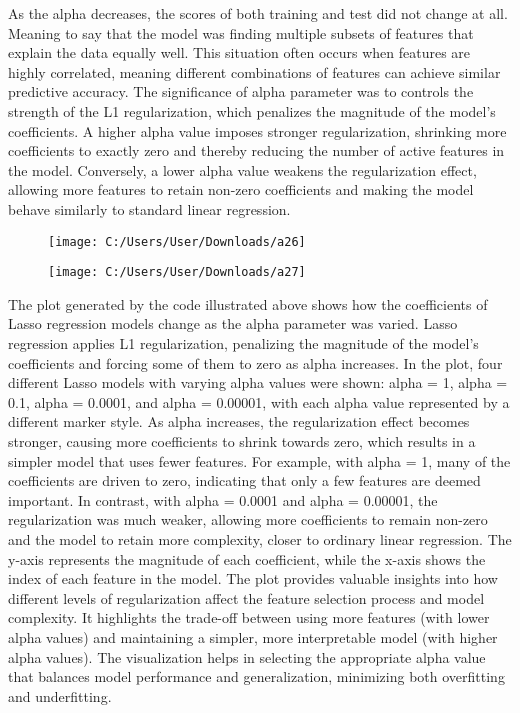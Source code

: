 \documentclass[12pt]{article}
\begin{document}
\indent As the alpha decreases, the scores of both training and test did not change at all. Meaning to say that the model was finding multiple subsets of features that explain the data equally well. This situation often occurs when features are highly correlated, meaning different combinations of features can achieve similar predictive accuracy. The significance of alpha parameter was to controls the strength of the L1 regularization, which penalizes the magnitude of the model's coefficients. A higher alpha value imposes stronger regularization, shrinking more coefficients to exactly zero and thereby reducing the number of active features in the model. Conversely, a lower alpha value weakens the regularization effect, allowing more features to retain non-zero coefficients and making the model behave similarly to standard linear regression.\\
\vspace{-10mm}
\begin{figure}[h!]
	\centering
	\texttt{[image: C:/Users/User/Downloads/a26]}
\end{figure}
\vspace{-10mm}
\begin{figure}[h!]
	\centering
	\texttt{[image: C:/Users/User/Downloads/a27]}
\end{figure}
\vspace{-6mm}

The plot generated by the code illustrated above shows how the coefficients of Lasso regression models change as the alpha parameter was varied. Lasso regression applies L1 regularization, penalizing the magnitude of the model's coefficients and forcing some of them to zero as alpha increases. In the plot, four different Lasso models with varying alpha values were shown: alpha = 1, alpha = 0.1, alpha = 0.0001, and alpha = 0.00001, with each alpha value represented by a different marker style. As alpha increases, the regularization effect becomes stronger, causing more coefficients to shrink towards zero, which results in a simpler model that uses fewer features. For example, with alpha = 1, many of the coefficients are driven to zero, indicating that only a few features are deemed important. In contrast, with alpha = 0.0001 and alpha = 0.00001, the regularization was much weaker, allowing more coefficients to remain non-zero and the model to retain more complexity, closer to ordinary linear regression. The y-axis represents the magnitude of each coefficient, while the x-axis shows the index of each feature in the model. The plot provides valuable insights into how different levels of regularization affect the feature selection process and model complexity. It highlights the trade-off between using more features (with lower alpha values) and maintaining a simpler, more interpretable model (with higher alpha values). The visualization helps in selecting the appropriate alpha value that balances model performance and generalization, minimizing both overfitting and underfitting.\\
\end{document}
